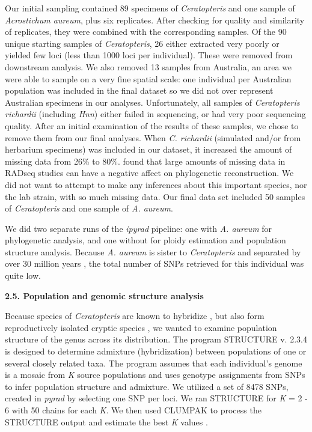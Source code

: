 \documentclass[12pt]{article}
\begin{document}
\begin{flushleft}
Our initial sampling contained 89 specimens of \textit{Ceratopteris} and one sample of \textit{Acrostichum aureum}, plus six replicates. After checking for quality and similarity of replicates, they were combined with the corresponding samples. Of the 90 unique starting samples of \textit{Ceratopteris}, 26 either extracted very poorly or yielded few loci (less than 1000 loci per individual). These were removed from downstream analysis. We also removed 13 samples from Australia, an area we were able to sample on a very fine spatial scale: one individual per Australian population was included in the final dataset so we did not over represent Australian specimens in our analyses. Unfortunately, all samples of \textit{Ceratopteris richardii} (including \textit{Hnn}) either failed in sequencing, or had very poor sequencing quality. After an initial examination of the results of these samples, we chose to remove them from our final analyses. When \textit{C. richardii} (simulated and/or from herbarium specimens) was included in our dataset, it increased the amount of missing data from 26\% to 80\%. \textcite{Hou2016} found that large amounts of missing data in RADseq studies can have a negative affect on phylogenetic reconstruction. We did not want to attempt to make any inferences about this important species, nor the lab strain, with so much missing data. Our final data set included 50 samples of \textit{Ceratopteris} and one sample of \textit{A. aureum}. 

We did two separate runs of the \textit{ipyrad} pipeline: one with \textit{A. aureum} for phylogenetic analysis, and one without for ploidy estimation and population structure analysis. Because \textit{A. aureum} is sister to \textit{Ceratopteris} and separated by over 30 million years \autocite{PPGI}, the total number of SNPs retrieved for this individual was quite low.

\textbf{2.5. Population and genomic structure analysis}

Because species of \textit{Ceratopteris} are known to hybridize \autocite{hickok1974}, but also form reproductively isolated cryptic species \autocite{Masuyama2002}, we wanted to examine population structure of the genus across its distribution. The program {\small{STRUCTURE}} v. 2.3.4 \autocite{Pritchard2000} is designed to determine admixture (hybridization) between populations of one or several closely related taxa. The program assumes that each individual's genome is a mosaic from \textit{K} source populations and uses genotype assignments from SNPs to infer population structure and admixture. We utilized a set of 8478 SNPs, created in \textit{pyrad} by selecting one SNP per loci. We ran {\small{STRUCTURE}} for \textit{K} = 2 - 6 with 50 chains for each \textit{K}. We then used {\small{CLUMPAK}} \autocite{Kopelman2015} to process the {\small{STRUCTURE}} output and estimate the best \textit{K} values \autocite{Evanno2005, Pritchard2000}.


\end{flushleft}
\end{document}
